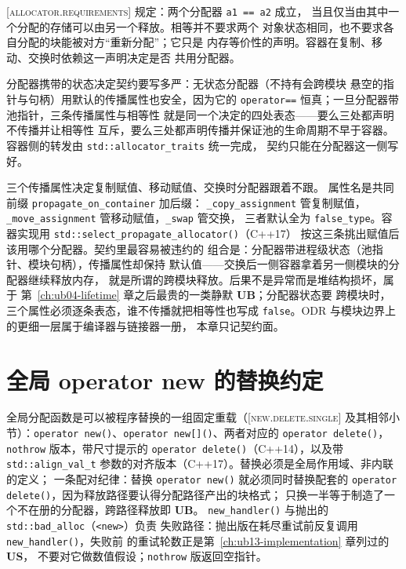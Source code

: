 \documentclass[12pt,a4paper,fontset=fandol]{ctexbook}
\newcommand{\cpp}[1]{C++#1}
\newcommand{\Fn}[1]{\texttt{#1()}}
\newcommand{\Tp}[1]{\texttt{#1}}
\newcommand{\Bk}{\discretionary{}{}{}}
\newcommand{\UB}{\textbf{\textsf{UB}}}
\newcommand{\USB}{\textbf{\textsf{US}}}
\newcommand{\Std}[1]{\textsc{[#1]}}
\newcommand{\Hdr}[1]{\texttt{<#1>}}
\begin{document}
\begin{clause}[title=标准怎么说：分配器相等的含义]
\Std{allocator.requirements} 规定：两个分配器 \Tp{a1 == a2} 成立，
当且仅当由其中一个分配的存储可以由另一个释放。相等并不要求两个
对象状态相同，也不要求各自分配的块能被对方“重新分配”；它只是
内存等价性的声明。容器在复制、移动、交换时依赖这一声明决定是否
共用分配器。
\end{clause}

分配器携带的状态决定契约要写多严：无状态分配器（不持有会跨模块
悬空的指针与句柄）用默认的传播属性也安全，因为它的
\Tp{operator==} 恒真；一旦分配器带池指针，三条传播属性与相等性
就是同一个决定的四处表态——要么三处都声明不传播并让相等性
互斥，要么三处都声明传播并保证池的生命周期不早于容器。
容器侧的转发由 \Tp{std::allocator{\Bk}\_traits} 统一完成，
契约只能在分配器这一侧写好。

三个传播属性决定复制赋值、移动赋值、交换时分配器跟着不跟。
属性名是共同前缀 \Tp{propagate{\Bk}\_on{\Bk}\_container} 加后缀：
\Tp{\_copy{\Bk}\_assignment} 管复制赋值，
\Tp{\_move{\Bk}\_assignment} 管移动赋值，\Tp{\_swap} 管交换，
三者默认全为 \Tp{false{\Bk}\_type}。容器实现用
\Fn{std::select{\Bk}\_propagate{\Bk}\_allocator}（\cpp{17}）
按这三条挑出赋值后该用哪个分配器。契约里最容易被违约的
组合是：分配器带进程级状态（池指针、模块句柄），传播属性却保持
默认值——交换后一侧容器拿着另一侧模块的分配器继续释放内存，
就是所谓的跨模块释放。后果不是异常而是堆结构损坏，属于
第~\ref{ch:ub04-lifetime} 章之后最贵的一类静默 \UB{}；分配器状态要
跨模块时，三个属性必须逐条表态，谁不传播就把相等性也写成
\Tp{false}。ODR 与模块边界上的更细一层属于编译器与链接器一册，
本章只记契约面。

\section{全局 operator new 的替换约定}\label{sec:ub14-global-new}

全局分配函数是可以被程序替换的一组固定重载（\Std{new.delete.single}
及其相邻小节）：\Fn{operator new}、\Fn{operator new[]}、两者对应的
\Fn{operator delete}，\Tp{nothrow} 版本，带尺寸提示的
\Fn{operator delete}（\cpp{14}），以及带 \Tp{std::align\_val\_t}
参数的对齐版本（\cpp{17}）。替换必须是全局作用域、非内联的定义；
一条配对纪律：替换 \Fn{operator new} 就必须同时替换配套的
\Fn{operator delete}，因为释放路径要认得分配路径产出的块格式；
只换一半等于制造了一个不在册的分配器，跨路径释放即 \UB{}。
\Fn{new\_handler} 与抛出的 \Tp{std::bad\_alloc}（\Hdr{new}）负责
失败路径：抛出版在耗尽重试前反复调用 \Fn{new\_handler}，失败前
的重试轮数正是第~\ref{ch:ub13-implementation} 章列过的 \USB{}，
不要对它做数值假设；\Tp{nothrow} 版返回空指针。
\end{document}
